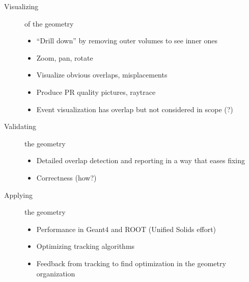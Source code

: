 \begin{description}
\begin{itemize}
  \end{itemize}
\item[Visualizing] of the geometry
  \begin{itemize}
  \item ``Drill down'' by removing outer volumes to see inner ones
  \item Zoom, pan, rotate
  \item Visualize obvious overlaps, misplacements
  \item Produce PR quality pictures, raytrace
  \item Event visualization has overlap but not considered in scope (?)
  \end{itemize}
\item[Validating] the geometry
  \begin{itemize}
  \item Detailed overlap detection and reporting in a way that eases fixing
  \item Correctness (how?)
  \end{itemize}
\item[Applying] the geometry 
  \begin{itemize}
  \item Performance in Geant4 and ROOT (Unified Solids effort)
  \item Optimizing tracking algorithms
  \item Feedback from tracking to find optimization in the geometry organization 
  \end{itemize}
\end{description}
